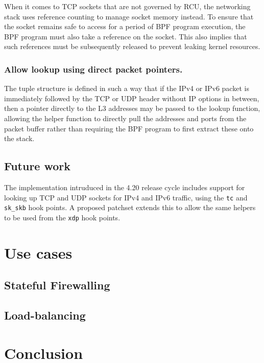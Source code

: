 \documentclass[10pt,sigconf,authorversion]{lpc}
\begin{document}
When it comes to TCP sockets that are not governed by RCU, the networking stack
uses reference counting to manage socket memory instead. To ensure that the
socket remains safe to access for a period of BPF program execution, the BPF
program must also take a reference on the socket. This also implies that such
references must be subsequently released to prevent leaking kernel resources.

\subsubsection{Allow lookup using direct packet pointers.}

The tuple structure is defined in such a way that if the IPv4 or IPv6 packet is
immediately followed by the TCP or UDP header without IP options in between,
then a pointer directly to the L3 addresses may be passed to the lookup
function, allowing the helper function to directly pull the addresses and ports
from the packet buffer rather than requiring the BPF program to first extract
these onto the stack.

\subsection{Future work}

The implementation intruduced in the 4.20 release cycle includes support for
looking up TCP and UDP sockets for IPv4 and IPv6 traffic, using the \verb+tc+
and \verb+sk_skb+ hook points. A proposed patchset extends this to allow the
same helpers to be used from the \verb+xdp+ hook points.

\section{Use cases}

\subsection{Stateful Firewalling}

\subsection{Load-balancing}

\section{Conclusion}
\end{document}
